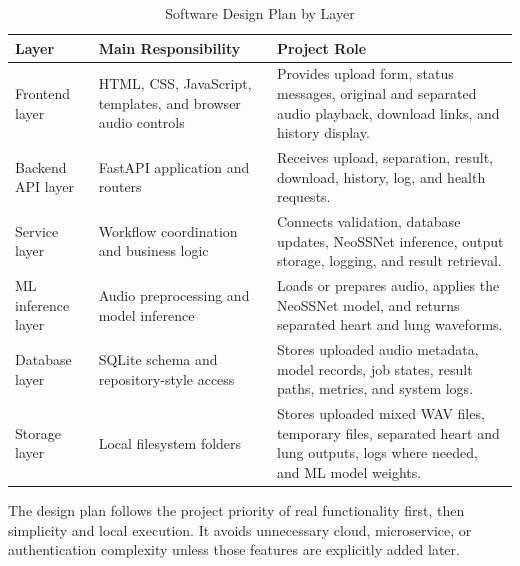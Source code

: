 \begin{table}[H]
  \centering
  \small
  \caption{Software Design Plan by Layer}
  \label{tab:software-design-plan}
  \begin{tabularx}{\textwidth}{p{} p{} Y}
    \toprule
    \textbf{Layer} & \textbf{Main Responsibility} & \textbf{Project Role} \\
    \midrule
    Frontend layer & HTML, CSS, JavaScript, templates, and browser audio controls & Provides upload form, status messages, original and separated audio playback, download links, and history display. \\
    Backend API layer & FastAPI application and routers & Receives upload, separation, result, download, history, log, and health requests. \\
    Service layer & Workflow coordination and business logic & Connects validation, database updates, NeoSSNet inference, output storage, logging, and result retrieval. \\
    ML inference layer & Audio preprocessing and model inference & Loads or prepares audio, applies the NeoSSNet model, and returns separated heart and lung waveforms. \\
    Database layer & SQLite schema and repository-style access & Stores uploaded audio metadata, model records, job states, result paths, metrics, and system logs. \\
    Storage layer & Local filesystem folders & Stores uploaded mixed WAV files, temporary files, separated heart and lung outputs, logs where needed, and ML model weights. \\
    \bottomrule
  \end{tabularx}
\end{table}

The design plan follows the project priority of real functionality first, then simplicity and local execution. It avoids unnecessary cloud, microservice, or authentication complexity unless those features are explicitly added later.
